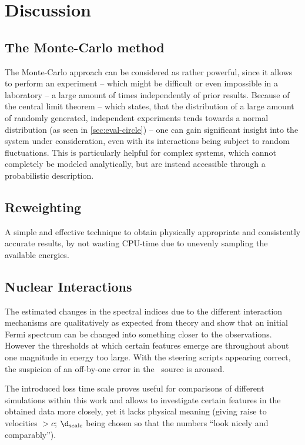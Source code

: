 \section{Discussion}
\subsection{The Monte-Carlo method}
The Monte-Carlo approach can be considered as rather powerful, since it allows
to perform  an experiment -- which might be difficult or even impossible in a
laboratory -- a large amount of times independently of prior results. Because of
the central limit theorem -- which states, that the distribution of a
large amount of randomly generated, independent experiments tends
towards a normal distribution (as seen in \cref{sec:eval-circle}) -- one
can gain significant insight into the system under consideration,
even with its interactions being subject to random fluctuations.
This is particularly helpful for complex systems, which cannot completely be
modeled analytically, but are instead accessible through a probabilistic
description.

\subsection{Reweighting}
A simple and effective technique to obtain physically appropriate and
consistently accurate results, by not wasting CPU-time due to unevenly sampling
the available energies.

\subsection{Nuclear Interactions}
The estimated changes in the spectral indices due to the different interaction
mechanisms are qualitatively as expected from theory and show that an initial
Fermi spectrum can be changed into something closer to the observations.
However the thresholds at which certain features emerge are throughout about
one magnitude in energy too large.  With the steering scripts appearing
correct, the suspicion of an off-by-one error in the \CRPropa~source is
aroused.

The introduced loss time scale proves useful for comparisons of different
simulations within this work and allows to investigate certain features in the
obtained data more closely, yet it lacks physical meaning (giving raise to
velocities $>c$; $\d_{\mathrm{scale}}$ being chosen so that the numbers
\enquote{look nicely and comparably}).

